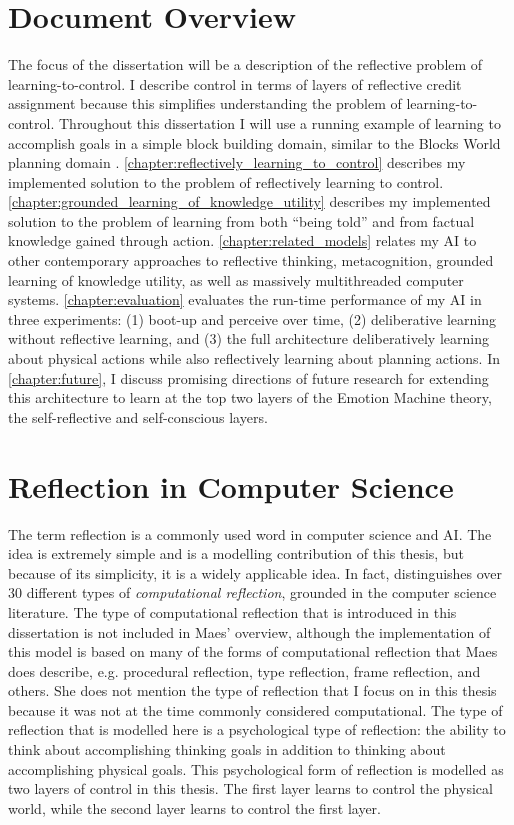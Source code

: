 \section{Document Overview}

The focus of the dissertation will be a description of the reflective
problem of learning-to-control.  I describe control in terms of layers
of reflective credit assignment because this simplifies understanding
the problem of learning-to-control.  Throughout this dissertation I
will use a running example of learning to accomplish goals in a simple
block building domain, similar to the Blocks World planning domain
{\cite[]{winograd:1970}}.
{\mbox{\autoref{chapter:reflectively_learning_to_control}}} describes
my implemented solution to the problem of reflectively learning to
control.
{\mbox{\autoref{chapter:grounded_learning_of_knowledge_utility}}}
describes my implemented solution to the problem of learning from both
``being told'' and from factual knowledge gained through action.
{\mbox{\autoref{chapter:related_models}}} relates my AI to other
contemporary approaches to reflective thinking, metacognition,
grounded learning of knowledge utility, as well as massively
multithreaded computer systems.  {\mbox{\autoref{chapter:evaluation}}}
evaluates the run-time performance of my AI in three experiments: (1)
boot-up and perceive over time, (2) deliberative learning without
reflective learning, and (3) the full architecture deliberatively
learning about physical actions while also reflectively learning about
planning actions.  In {\mbox{\autoref{chapter:future}}}, I discuss
promising directions of future research for extending this
architecture to learn at the top two layers of the Emotion Machine
theory, the self-reflective and self-conscious layers.

\section{Reflection in Computer Science}

The term reflection is a commonly used word in computer science and
AI.  The idea is extremely simple and is a modelling contribution of
this thesis, but because of its simplicity, it is a widely applicable
idea.  In fact, \cite{maes:1988} distinguishes over 30 different types
of \emph{computational reflection}, grounded in the computer science
literature.  The type of computational reflection that is introduced
in this dissertation is not included in Maes' overview, although the
implementation of this model is based on many of the forms of
computational reflection that Maes does describe, e.g. procedural
reflection, type reflection, frame reflection, and others.  She does
not mention the type of reflection that I focus on in this thesis
because it was not at the time commonly considered computational.  The
type of reflection that is modelled here is a psychological type of
reflection: the ability to think about accomplishing thinking goals in
addition to thinking about accomplishing physical goals.  This
psychological form of reflection is modelled as two layers of control
in this thesis.  The first layer learns to control the physical world,
while the second layer learns to control the first layer.

